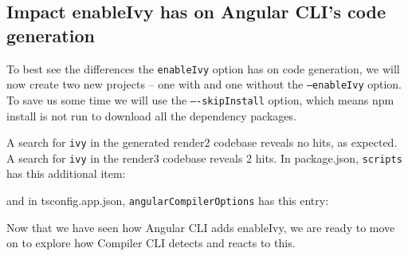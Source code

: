 \subsection{Impact enableIvy has on Angular CLI’s code generation}

To best see the differences the
\texttt{enableIvy}
option has on code generation, we will now
create two new projects – one with and one without the
\texttt{--enableIvy}
option. To save
us some time we will use the
\texttt{–-skipInstall}
option, which means npm install is not
run to download all the dependency packages.



A search for
\texttt{ivy}
in the generated render2 codebase reveals no hits, as expected. A
search for
\texttt{ivy}
in the render3 codebase reveals 2 hits. In package.json,
\texttt{scripts}
has
this additional item:



and in tsconfig.app.json,
\texttt{angularCompilerOptions}
has this entry:



Now that we have seen how Angular CLI adds enableIvy, we are ready to move on to
explore how Compiler CLI detects and reacts to this.
